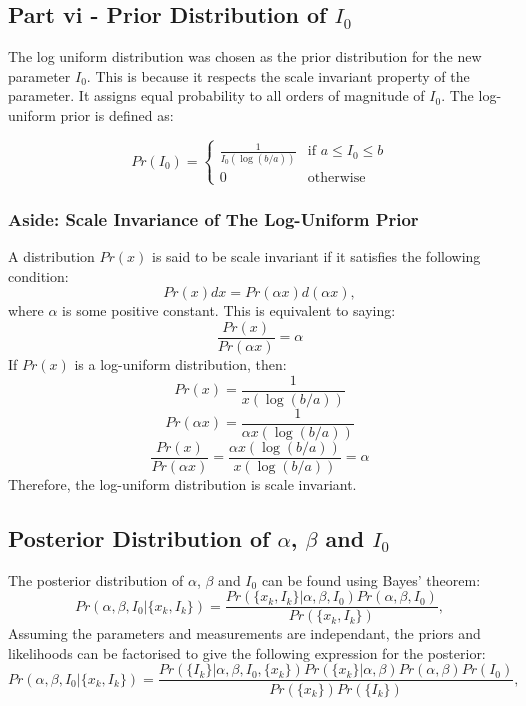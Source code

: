 \documentclass[11pt]{article}
\begin{document}
\subsection{Part vi - Prior Distribution of $I_0$}
The log uniform distribution was chosen as the prior distribution for the new parameter $I_0$. This is because it respects the scale invariant property of the parameter. It assigns equal probability to all orders of magnitude of $I_0$. The log-uniform prior is defined as:

\begin{equation}
    Pr(I_0) = \left\{
        \begin{array}{ll}
            \frac{1}{I_0(\log(b/a))} & \text{if } a \leq I_0 \leq b \\
            0 & \text{otherwise}
        \end{array}
    \right.
\end{equation}

\subsubsection{Aside: Scale Invariance of The Log-Uniform Prior}
A distribution $Pr(x)$ is said to be scale invariant if it satisfies the following condition:
$$
Pr(x)dx = Pr(\alpha x) d(\alpha x),
$$ where $\alpha$ is some positive constant. This is equivalent to saying:
$$
\frac{Pr(x)}{Pr(\alpha x)} = \alpha
$$
If $Pr(x)$ is a log-uniform distribution, then:
$$
Pr(x) = \frac{1}{x(\log(b/a))}
$$
$$
Pr(\alpha x) = \frac{1}{\alpha x(\log(b/a))}
$$
$$
\frac{Pr(x)}{Pr(\alpha x)} = \frac{\alpha x(\log(b/a))}{x(\log(b/a))} = \alpha
$$
Therefore, the log-uniform distribution is scale invariant.

\subsection{Posterior Distribution of $\alpha$, $\beta$ and $I_0$}

 The posterior distribution of $\alpha$, $\beta$ and $I_0$ can be found using Bayes' theorem:
\begin{equation}
    Pr(\alpha, \beta, I_0 | \{x_k, I_k\}) = \frac{Pr(\{x_k, I_k\} | \alpha, \beta, I_0) Pr(\alpha, \beta, I_0)}{Pr(\{x_k, I_k\})},
\end{equation}
Assuming the parameters and measurements are independant, the priors and likelihoods can be factorised to give the following expression for the posterior:
$$
Pr(\alpha, \beta, I_0 | \{x_k, I_k\}) = \frac{Pr(\{I_k\} | \alpha, \beta, I_0,\{x_k\})Pr(\{x_k\} | \alpha, \beta)  Pr(\alpha, \beta)Pr(I_0)}{Pr(\{x_k\})Pr(\{I_k\})},
$$
\end{document}
